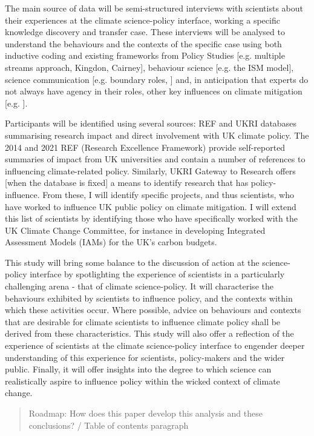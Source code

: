 The main source of data will be semi-structured interviews with scientists about their experiences at the climate science-policy interface, working a specific knowledge discovery and transfer case. These interviews will be analysed to understand the behaviours and the contexts of the specific case using both inductive coding and existing frameworks from Policy Studies [e.g. multiple streams approach, Kingdon, Cairney], behaviour science [e.g. the ISM model], science communication [e.g. boundary roles, \cite{RapleyD2014, GluckmanBK2021}] and, in anticipation that experts do not always have agency in their roles, other key influences on climate mitigation [e.g. \cite{StoddardEtAl2021}].

Participants will be identified using several sources: REF and UKRI databases summarising research impact and direct involvement with UK climate policy. The 2014 and 2021 REF (Research Excellence Framework) provide self-reported summaries of impact from UK universities and contain a number of references to influencing climate-related policy. Similarly, UKRI Gateway to Research offers [when the database is fixed] a means to identify research that has policy-influence. From these, I will identify specific projects, and thus scientists, who have worked to influence UK public policy on climate mitigation. I will extend this list of scientists by identifying those who have specifically worked with the UK Climate Change Committee, for instance in developing Integrated Assessment Models (IAMs) for the UK’s carbon budgets.

This study will bring some balance to the discussion of action at the science-policy interface by spotlighting the experience of scientists in a particularly challenging arena - that of climate science-policy. It will characterise the behaviours exhibited by scientists to influence policy, and the contexts within which these activities occur. Where possible, advice on behaviours and contexts that are desirable for climate scientists to influence climate policy shall be derived from these characteristics. This study will also offer a reflection of the experience of scientists at the climate science-policy interface to engender deeper understanding of this experience for scientists, policy-makers and the wider public. Finally, it will offer insights into the degree to which science can realistically aspire to influence policy within the wicked context of climate change.

\begin{quote}
    Roadmap: How does this paper develop this analysis and these conclusions? / Table of contents paragraph 
\end{quote}
